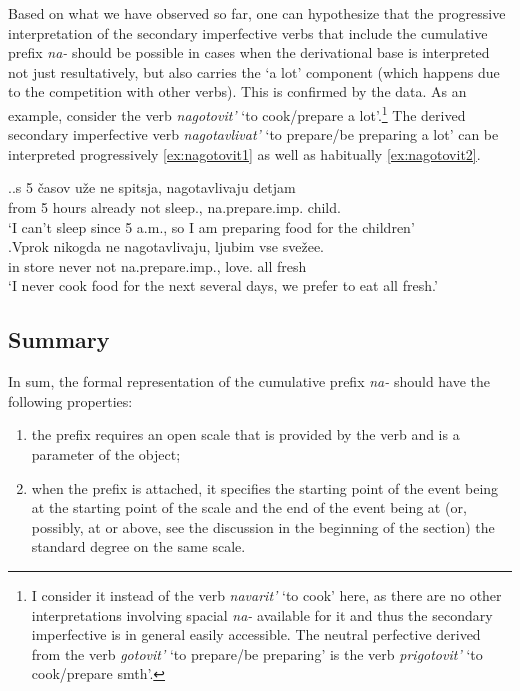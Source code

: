 Based on what we have observed so far, one can hypothesize that the progressive interpretation of the secondary imperfective verbs that include the cumulative prefix \textit{na-} should be possible in cases when the derivational base is interpreted not just resultatively, but also carries the `a lot' component (which happens due to the competition with other verbs). This is confirmed by the data. As an example, consider the verb \textit{nagotovit'} `to cook/prepare a lot'.\footnote{I consider it instead of the verb \textit{navarit'} `to cook' here, as there are no other interpretations involving spacial \textit{na-} available for it and thus the secondary imperfective is in general easily accessible. The neutral perfective derived from the verb \textit{gotovit'} `to prepare/be preparing' is the verb \textit{prigotovit'} `to cook/prepare smth'.}  The derived secondary imperfective verb \textit{nagotavlivat'} `to prepare/be preparing a lot' can be interpreted progressively \ref{ex:nagotovit1} as well as habitually \ref{ex:nagotovit2}.

\ex.\label{ex:nagotovit}\ag.\label{ex:nagotovit1}s 5 \v{c}asov u\v{z}e ne spitsja, nagotavlivaju detjam\\
from 5 hours already not sleep., na.prepare.imp. child.\\
\trans `I can't sleep since 5 a.m., so I am preparing food for the children'\\
\bg.\label{ex:nagotovit2}Vprok nikogda ne nagotavlivaju, ljubim vse sve\v{z}ee.\\
{in store} never not na.prepare.imp., love. all fresh\\
\trans `I never cook food for the next several days, we prefer to eat all fresh.'\\

\subsection{Summary} 
In sum, the formal representation of the cumulative prefix \textit{na-} should have the following properties: 
\begin{enumerate}
\item the prefix requires an open scale that is provided by the verb and is a parameter of the object;
\item when the prefix is attached, it specifies the starting point of the event being at the starting point of the scale and the end of the event being at (or, possibly, at or above, see the discussion in the beginning of the section) the standard degree on the same scale.
\end{enumerate}

